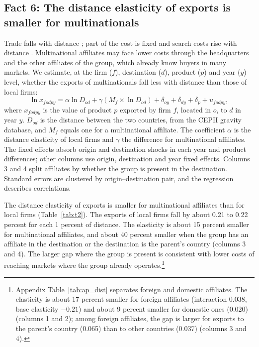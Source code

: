 \FloatBarrier
\subsection{Fact 6: The distance elasticity of exports is smaller for multinationals}

Trade falls with distance \citep{head2014}; part of the cost is fixed \citep{chaney2008} and search costs
rise with distance \citep{rauch1999}. Multinational affiliates may face lower costs through the headquarters and the
other affiliates of the group, which already know buyers in many markets. We estimate, at the firm ($f$),
destination ($d$), product ($p$) and year ($y$) level, whether the exports of multinationals fall less with distance
than those of local firms:
\begin{equation}\label{eq:dist}
\ln x_{fodpy} = \alpha \ln D_{od} + \gamma \left(M_{f} \times \ln D_{od}\right) + \delta_{oy} + \delta_{dy} + \delta_{p} + u_{fodpy},
\end{equation}
where $x_{fodpy}$ is the value of product $p$ exported by firm $f$, located in $o$, to $d$ in year $y$. $D_{od}$
is the distance between the two countries, from the CEPII gravity database, and $M_f$ equals one for a multinational
affiliate. The coefficient $\alpha$ is the distance elasticity of local firms and $\gamma$ the difference for
multinational affiliates. The fixed effects absorb origin and destination shocks in each year and product
differences; other columns use origin, destination and year fixed effects. Columns 3 and 4 split affiliates by
whether the group is present in the destination. Standard errors are clustered by origin--destination pair, and the
regression describes correlations.

The distance elasticity of exports is smaller for multinational affiliates than for local firms
(Table~\ref{tab:t2}). The exports of local firms fall by about 0.21 to 0.22 percent for each 1 percent of distance.
The elasticity is about 15 percent smaller for multinational affiliates, and about 40 percent smaller when the group
has an affiliate in the destination or the destination is the parent's country (columns 3 and 4). The larger gap
where the group is present is consistent with lower costs of reaching markets where the group already
operates.\footnote{Appendix Table~\ref{tab:ap_dist} separates foreign and domestic affiliates. The elasticity is about 17 percent smaller for foreign affiliates (interaction 0.038, base elasticity $-0.21$) and about 9 percent smaller for domestic ones (0.020) (columns 1 and 2); among foreign affiliates, the gap is larger for exports to the parent's country (0.065) than to other countries (0.037) (columns 3 and 4).}

